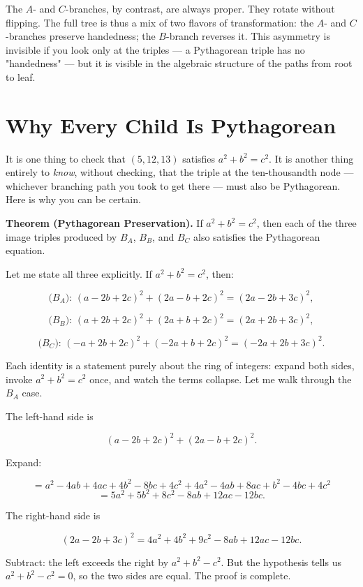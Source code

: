 \documentclass[11pt,twoside,openright]{book}
\theoremstyle{definition}
\theoremstyle{remark}
\begin{document}
The $A$- and $C$-branches, by contrast, are always proper. They rotate without flipping. The full tree is thus a mix of two flavors of transformation: the $A$- and $C$-branches preserve handedness; the $B$-branch reverses it. This asymmetry is invisible if you look only at the triples --- a Pythagorean triple has no "handedness" --- but it is visible in the algebraic structure of the paths from root to leaf.


\section{Why Every Child Is Pythagorean}

It is one thing to check that $(5, 12, 13)$ satisfies $a^2 + b^2 = c^2$. It is another thing entirely to \textit{know}, without checking, that the triple at the ten-thousandth node --- whichever branching path you took to get there --- must also be Pythagorean. Here is why you can be certain.

\textbf{Theorem (Pythagorean Preservation).} If $a^2 + b^2 = c^2$, then each of the three image triples produced by $B_A$, $B_B$, and $B_C$ also satisfies the Pythagorean equation.

Let me state all three explicitly. If $a^2 + b^2 = c^2$, then:

\[\text{($B_A$): } (a - 2b + 2c)^2 + (2a - b + 2c)^2 = (2a - 2b + 3c)^2,\]

\[\text{($B_B$): } (a + 2b + 2c)^2 + (2a + b + 2c)^2 = (2a + 2b + 3c)^2,\]

\[\text{($B_C$): } (-a + 2b + 2c)^2 + (-2a + b + 2c)^2 = (-2a + 2b + 3c)^2.\]

Each identity is a statement purely about the ring of integers: expand both sides, invoke $a^2 + b^2 = c^2$ once, and watch the terms collapse. Let me walk through the $B_A$ case.

The left-hand side is

\[(a - 2b + 2c)^2 + (2a - b + 2c)^2.\]

Expand:

\[= a^2 - 4ab + 4ac + 4b^2 - 8bc + 4c^2 + 4a^2 - 4ab + 8ac + b^2 - 4bc + 4c^2\]
\[= 5a^2 + 5b^2 + 8c^2 - 8ab + 12ac - 12bc.\]

The right-hand side is

\[(2a - 2b + 3c)^2 = 4a^2 + 4b^2 + 9c^2 - 8ab + 12ac - 12bc.\]

Subtract: the left exceeds the right by $a^2 + b^2 - c^2$. But the hypothesis tells us $a^2 + b^2 - c^2 = 0$, so the two sides are equal. The proof is complete.
\end{document}
